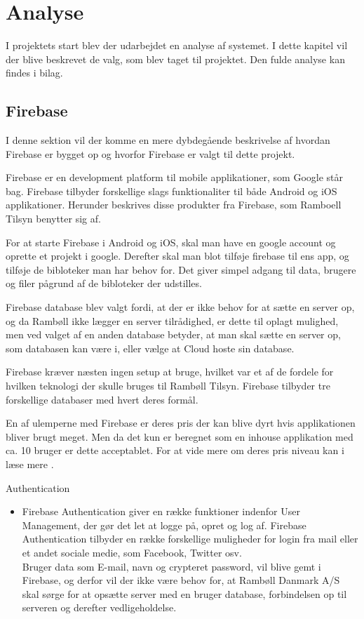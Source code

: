\chapter{Analyse}
I projektets start blev der udarbejdet en analyse af systemet. I dette kapitel vil der blive beskrevet de valg, som blev taget til projektet. Den fulde analyse kan findes i bilag. \\

\section{Firebase}
I denne sektion vil der komme en mere dybdegående beskrivelse af hvordan Firebase er bygget op og hvorfor Firebase er valgt til dette projekt.

Firebase\cite{Firebase} er en development platform til mobile applikationer, som Google står bag. Firebase tilbyder forskellige slags funktionaliter til både Android og iOS applikationer. Herunder beskrives disse produkter fra Firebase, som Ramboell Tilsyn benytter sig af.

For at starte Firebase i Android og iOS, skal man have en google account og oprette et projekt i google. Derefter skal man blot tilføje firebase til ens app, og tilføje de bibloteker man har behov for.
Det giver simpel adgang til data, brugere og filer pågrund af de bibloteker der udstilles. 

Firebase database blev valgt fordi, at der er ikke behov for at sætte en server op, og da Rambøll ikke lægger en server tilrådighed, er dette til oplagt mulighed, men ved valget af en anden database betyder, at man skal sætte en server op, som databasen kan være i, eller vælge at Cloud hoste\cite{Cloud} sin database. 

Firebase kræver næsten ingen setup at bruge, hvilket var et af de fordele for hvilken teknologi der skulle bruges til Rambøll Tilsyn. Firebase tilbyder tre forskellige databaser med hvert deres formål. 

En af ulemperne med Firebase er deres pris der kan blive dyrt hvis applikationen bliver brugt meget. Men da det kun er beregnet som en inhouse applikation med ca. 10 bruger er dette acceptablet. For at vide mere om deres pris niveau kan i læse mere \cite{FirebasePricing}. 

	Authentication\cite{FirebaseAuth}
	\begin{itemize}[-]
		\itemsep 0.3em 
		\item[] Firebase Authentication giver en række funktioner indenfor User Management, der gør det let at logge på, opret og log af. Firebase Authentication tilbyder en række forskellige muligheder for login fra mail eller et andet sociale medie, som Facebook, Twitter osv. \\
		Bruger data som E-mail, navn og crypteret password, vil blive gemt i Firebase, og derfor vil der ikke være behov for, at Rambøll Danmark A/S skal sørge for at opsætte server med en bruger database, forbindelsen op til serveren og derefter vedligeholdelse. 
	\end{itemize}	
	

